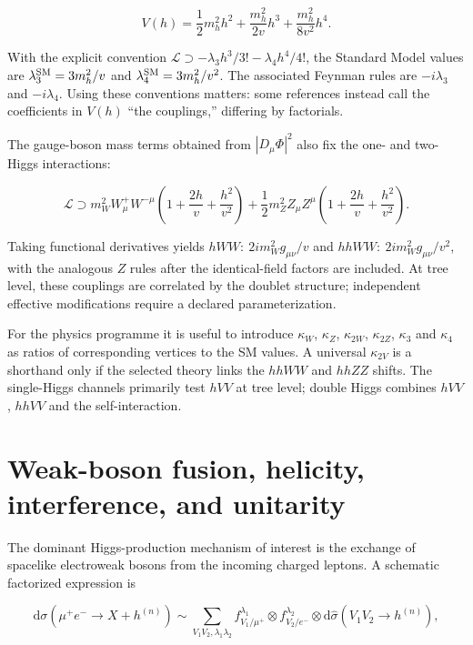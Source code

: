 \documentclass[12pt,a4paper]{article}
\newcommand{\newnote}{\clearpage}
\begin{document}
\begin{equation}\label{eq:potential}
V(h)=\frac12m_h^2h^2+\frac{m_h^2}{2v}h^3+\frac{m_h^2}{8v^2}h^4.
\end{equation}

With the explicit convention $\mathcal L\supset -\lambda_3h^3/3!-\lambda_4h^4/4!$, the Standard Model values are $\lambda_3^{\rm SM}=3m_h^2/v$ and $\lambda_4^{\rm SM}=3m_h^2/v^2$. The associated Feynman rules are $-i\lambda_3$ and $-i\lambda_4$. Using these conventions matters: some references instead call the coefficients in $V(h)$ ``the couplings,'' differing by factorials.

The gauge-boson mass terms obtained from $|D_\mu\Phi|^2$ also fix the one- and two-Higgs interactions:

\begin{equation}
\label{eq:gaugeh}
\mathcal L\supset m_W^2W_\mu^+W^{-\mu}\left(1+\frac{2h}{v}+\frac{h^2}{v^2}\right)
+\frac12m_Z^2Z_\mu Z^\mu\left(1+\frac{2h}{v}+\frac{h^2}{v^2}\right).
\end{equation}

Taking functional derivatives yields $hWW:\ 2im_W^2g_{\mu\nu}/v$ and $hhWW:\ 2im_W^2g_{\mu\nu}/v^2$, with the analogous $Z$ rules after the identical-field factors are included. At tree level, these couplings are correlated by the doublet structure; independent effective modifications require a declared parameterization.

For the physics programme it is useful to introduce $\kappa_W$, $\kappa_Z$, $\kappa_{2W}$, $\kappa_{2Z}$, $\kappa_3$ and $\kappa_4$ as ratios of corresponding vertices to the SM values. A universal $\kappa_{2V}$ is a shorthand only if the selected theory links the $hhWW$ and $hhZZ$ shifts. The single-Higgs channels primarily test $hVV$ at tree level; double Higgs combines $hVV$, $hhVV$ and the self-interaction.




\newnote

\section{Weak-boson fusion, helicity, interference, and unitarity}
The dominant Higgs-production mechanism of interest is the exchange of spacelike electroweak bosons from the incoming charged leptons. A schematic factorized expression is

\begin{equation}
\mathrm d\sigma(\mu^+e^-\to X+h^{(n)})\sim
\sum_{V_1V_2,\lambda_1\lambda_2}
 f_{V_1/\mu^+}^{\lambda_1}\otimes f_{V_2/e^-}^{\lambda_2}
 \otimes\mathrm d\hat\sigma(V_1V_2\to h^{(n)}),
\end{equation}
\end{document}
